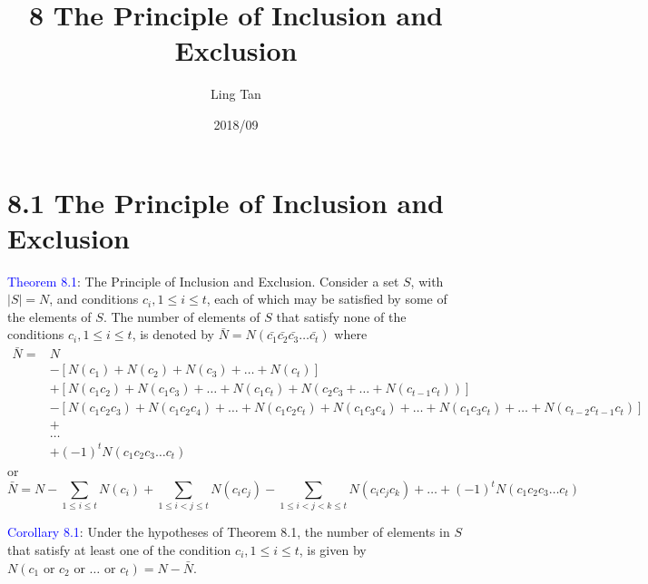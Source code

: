 \documentclass[a4paper]{article}
\title{8 The Principle of Inclusion and Exclusion}
\author{Ling Tan}
\date{2018/09}
\begin{document}
\maketitle

\section*{8.1 The Principle of Inclusion and Exclusion}

\textcolor{blue}{Theorem 8.1}: The Principle of Inclusion and Exclusion. Consider a set $S$, with $|S|=N$, and conditions $c_i,1\leq i\leq t$, each of which may be satisfied by some of the elements of $S$. The number of elements of $S$ that satisfy none of the conditions $c_i,1\leq i\leq t$, is 
denoted by $\bar {N}=N(\bar { c_1} \bar { c_2} \bar { c_3} \dots \bar { c_t})$ where
\begin{align*}
\bar {N} = & N\\
& -[N(c_1)+N(c_2)+N(c_3)+\dots + N(c_t)] \\
& +  [N(c_1 c_2)+N(c_1 c_3)+\dots+N(c_1 c_t)+N(c_2 c_3+\dots+N(c_{t-1} c_t))]\\ 
& -  [N(c_1 c_2 c_3)+N(c_1 c_2 c_4)+\dots+N(c_1 c_2 c_t)+N(c_1 c_3 c_4)+\dots+N(c_1 c_3 c_t)+\dots +N(c_{t-2} c_{t-1} c_t)]\\ 
& + \\
& \dots \\
& + (-1)^t N(c_1 c_2 c_3 \dots c_t)
\end{align*}
or
$$
\bar {N} = N - \sum_{1\leq i \leq t} N(c_i) + \sum_{1\leq i < j \leq t} N(c_i c_j) - \sum_{1\leq i < j < k \leq t} N(c_i c_j c_k) +  \dots + (-1)^t N(c_1 c_2 c_3 \dots c_t)
$$

\textcolor{blue}{Corollary 8.1}: Under the hypotheses of Theorem 8.1, the number of elements in $S$ that satisfy at least one of the condition $c_i,1\leq i\leq t$, is given by $N(c_1\text{ or }c_2\text{ or }\dots\text{ or } c_t)=N-\bar{N}$.
\end{document}
